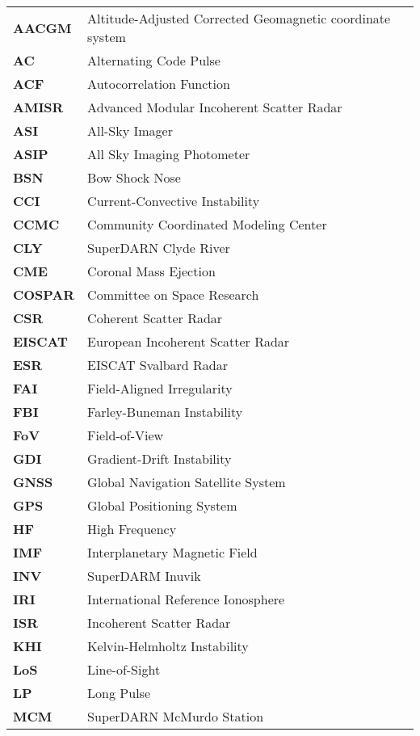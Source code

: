 
\begin{longtable}{ll}
\textbf{AACGM} & Altitude-Adjusted Corrected Geomagnetic coordinate system \\
\textbf{AC} & Alternating Code Pulse \\
\textbf{ACF} & Autocorrelation Function \\
\textbf{AMISR} & Advanced Modular Incoherent Scatter Radar \\
\textbf{ASI} & All-Sky Imager \\
\textbf{ASIP} & All Sky Imaging Photometer \\
\textbf{BSN} & Bow Shock Nose \\
\textbf{CCI} & Current-Convective Instability \\
\textbf{CCMC} & Community Coordinated Modeling Center \\
\textbf{CLY} & SuperDARN Clyde River \\
\textbf{CME} & Coronal Mass Ejection \\
\textbf{COSPAR} & Committee on Space Research \\
\textbf{CSR} & Coherent Scatter Radar \\
\textbf{EISCAT} & European Incoherent Scatter Radar \\
\textbf{ESR} & EISCAT Svalbard Radar \\
\textbf{FAI} & Field-Aligned Irregularity \\
\textbf{FBI} & Farley-Buneman Instability \\
\textbf{FoV} & Field-of-View \\
\textbf{GDI} & Gradient-Drift Instability \\
\textbf{GNSS} & Global Navigation Satellite System \\
\textbf{GPS} & Global Positioning System \\
\textbf{HF} & High Frequency \\
\textbf{IMF} & Interplanetary Magnetic Field \\
\textbf{INV} & SuperDARM Inuvik \\
\textbf{IRI} & International Reference Ionosphere \\
\textbf{ISR} & Incoherent Scatter Radar \\
\textbf{KHI} & Kelvin-Helmholtz Instability \\
\textbf{LoS} & Line-of-Sight \\
\textbf{LP} & Long Pulse \\
\textbf{MCM} & SuperDARN McMurdo Station \\

\end{longtable}
